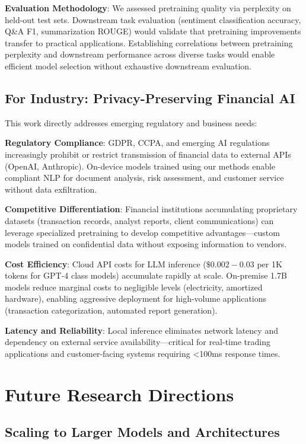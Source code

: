 \textbf{Evaluation Methodology}: We assessed pretraining quality via perplexity on held-out test sets. Downstream task evaluation (sentiment classification accuracy, Q\&A F1, summarization ROUGE) would validate that pretraining improvements transfer to practical applications. Establishing correlations between pretraining perplexity and downstream performance across diverse tasks would enable efficient model selection without exhaustive downstream evaluation.

\subsection{For Industry: Privacy-Preserving Financial AI}

This work directly addresses emerging regulatory and business needs:

\textbf{Regulatory Compliance}: GDPR, CCPA, and emerging AI regulations increasingly prohibit or restrict transmission of financial data to external APIs (OpenAI, Anthropic). On-device models trained using our methods enable compliant NLP for document analysis, risk assessment, and customer service without data exfiltration.

\textbf{Competitive Differentiation}: Financial institutions accumulating proprietary datasets (transaction records, analyst reports, client communications) can leverage specialized pretraining to develop competitive advantages—custom models trained on confidential data without exposing information to vendors.

\textbf{Cost Efficiency}: Cloud API costs for LLM inference ($\$0.002-0.03$ per 1K tokens for GPT-4 class models) accumulate rapidly at scale. On-premise 1.7B models reduce marginal costs to negligible levels (electricity, amortized hardware), enabling aggressive deployment for high-volume applications (transaction categorization, automated report generation).

\textbf{Latency and Reliability}: Local inference eliminates network latency and dependency on external service availability—critical for real-time trading applications and customer-facing systems requiring <100ms response times.

\section{Future Research Directions}

\subsection{Scaling to Larger Models and Architectures}

